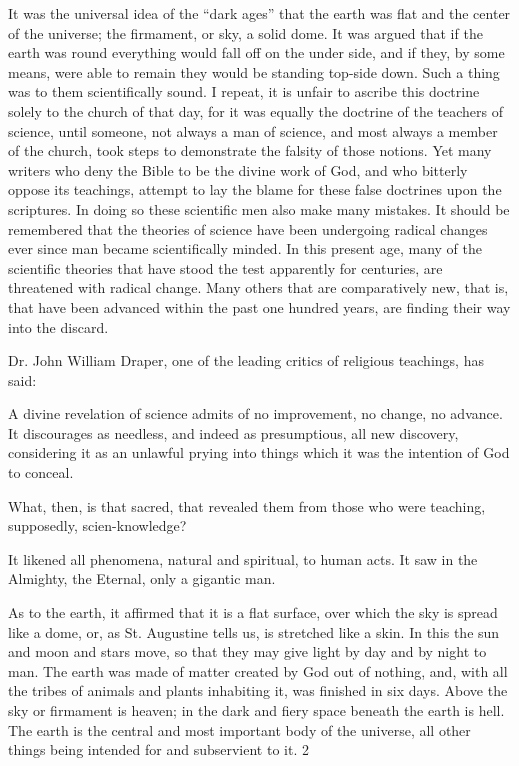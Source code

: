 It was the universal idea of the ``dark ages'' that the earth was flat and the center of the
universe; the firmament, or sky, a solid dome. It was argued that if the earth was round
everything would fall off on the under side, and if they, by some means, were able to remain
they would be standing top-side down. Such a thing was to them scientifically sound. I
repeat, it is unfair to ascribe this doctrine solely to the church of that day, for it was equally
the doctrine of the teachers of science, until someone, not always a man of science, and most
always a member of the church, took steps to demonstrate the falsity of those notions. Yet
many writers who deny the Bible to be the divine work of God, and who bitterly oppose its
teachings, attempt to lay the blame for these false doctrines upon the scriptures. In doing so
these scientific men also make many mistakes. It should be remembered that the theories of
science have been undergoing radical changes ever since man became scientifically minded.
In this present age, many of the scientific theories that have stood the test apparently for
centuries, are threatened with radical change. Many others that are comparatively new, that
is, that have been advanced within the past one hundred years, are finding their way into the
discard.

Dr. John William Draper, one of the leading critics of religious teachings, has said:

A divine revelation of science admits of no improvement, no change, no advance. It
discourages as needless, and indeed as presumptious, all new discovery, considering it as an
unlawful prying into things which it was the intention of God to conceal.

What, then, is that sacred, that revealed them from those who were teaching, supposedly,
scien-knowledge?

It likened all phenomena, natural and spiritual, to human acts. It saw in the Almighty, the
Eternal, only a gigantic man.

As to the earth, it affirmed that it is a flat surface, over which the sky is spread like a dome,
or, as St. Augustine tells us, is stretched like a skin. In this the sun and moon and stars move,
so that they may give light by day and by night to man. The earth was made of matter created
by God out of nothing, and, with all the tribes of animals and plants inhabiting it, was
finished in six days. Above the sky or firmament is heaven; in the dark and fiery space
beneath the earth is hell. The earth is the central and most important body of the universe, all
other things being intended for and subservient to it. 2

